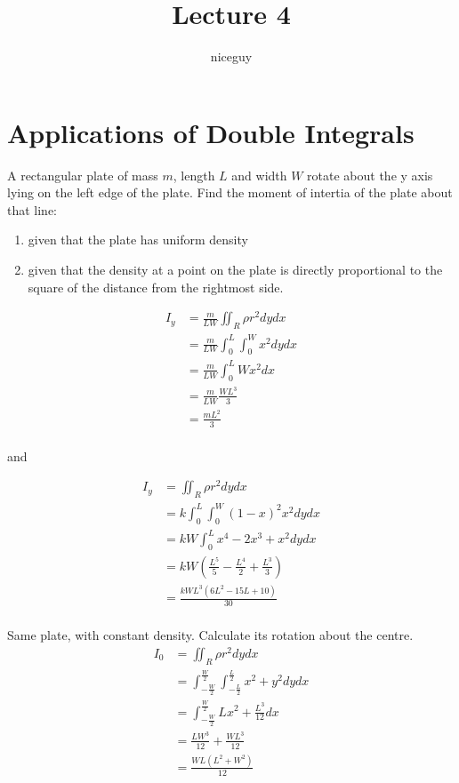 \documentclass[12pt]{article}
\author{niceguy}
\title{Lecture 4}
\begin{document}
\maketitle

\section{Applications of Double Integrals}

\begin{ex}
	A rectangular plate of mass $m$, length $L$ and width $W$ rotate about the y axis lying on the left edge of the plate. Find the moment of intertia of the plate about that line: \\
	\begin{enumerate}
		\item given that the plate has uniform density \\
		\item given that the density at a point on the plate is directly proportional to the square of the distance from the rightmost side.
	\end{enumerate}
	\begin{align*}
		I_y &= \frac{m}{LW} \iint_R \rho r^2 dydx \\
		    &= \frac{m}{LW} \int_0^L \int_0^W x^2 dydx \\
		    &= \frac{m}{LW} \int_0^L Wx^2 dx \\
		    &= \frac{m}{LW} \frac{WL^3}{3} \\
		    &= \frac{mL^2}{3} \\
	\end{align*}

	and

	\begin{align*}
		I_y &= \iint_R \rho r^2 dydx \\
		      &= k \int_0^L \int_0^W (1-x)^2x^2 dydx \\
		      &= kW \int_0^L x^4 - 2x^3 + x^2 dydx \\
		      &= kW \left(\frac{L^5}{5} - \frac{L^4}{2} + \frac{L^3}{3}\right) \\
		      &= \frac{kWL^3(6L^2 - 15L + 10)}{30} \\
	\end{align*}
\end{ex}

\begin{ex}
	Same plate, with constant density. Calculate its rotation about the centre.
	\begin{align*}
		I_0 &= \iint_R \rho r^2 dydx \\
		    &= \int_{-\frac{W}{2}}^{\frac{W}{2}} \int_{-\frac{L}{2}}^{\frac{L}{2}} x^2 + y^2 dydx \\
		    &= \int_{-\frac{W}{2}}^{\frac{W}{2}} Lx^2 + \frac{L^3}{12} dx \\
		    &= \frac{LW^3}{12} + \frac{WL^3}{12} \\
		    &= \frac{WL(L^2 + W^2)}{12} \\
	\end{align*}
\end{ex}
\end{document}
